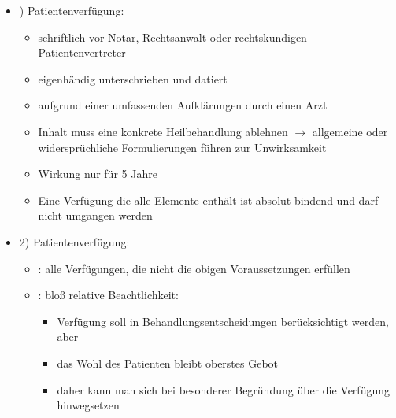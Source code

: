 \begin{itemize}
	\item[] {)  Patientenverf\"ugung:}


	\begin{itemize}
		\item {\mdseries
		schriftlich vor Notar, Rechtsanwalt oder rechtskundigen
		Patientenvertreter}

		\item {\mdseries
		eigenhändig unterschrieben und datiert}

		\item {\mdseries
		aufgrund einer umfassenden Aufklärungen durch einen Arzt}

		\item {\mdseries
		Inhalt muss eine konkrete Heilbehandlung ablehnen ${\rightarrow}$ allgemeine oder
		widerspr\"uchliche Formulierungen f\"uhren zur Unwirksamkeit}

		\item {\mdseries
		Wirkung nur f\"ur 5 Jahre}

		\item[] 
		Eine Verf\"ugung die alle Elemente enthält ist absolut bindend und
		darf nicht umgangen werden
	\end{itemize}

	\item 
	2)  Patientenverf\"ugung:

	\begin{itemize}
		\item {\mdseries
		: alle Verf\"ugungen, die nicht
		die obigen Voraussetzungen erf\"ullen}

		\item {\mdseries
		: blo{\ss} relative
		Beachtlichkeit:}

		\begin{itemize}
			\item {\mdseries
			Verf\"ugung soll in Behandlungsentscheidungen ber\"ucksichtigt werden,
			aber}

			\item {\mdseries
			das Wohl des Patienten bleibt oberstes Gebot }

			\item {\mdseries
			daher kann man sich bei besonderer Begr\"undung \"uber die Verf\"ugung
			hinwegsetzen}

		\end{itemize}
	\end{itemize}
\end{itemize}

